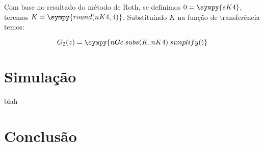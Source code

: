 \documentclass[a4paper,11pt]{article}
\newcommand{\npy}[1]{\sympy{round(#1,4)}}
\begin{document}
Com base no resultado do método de Roth, se definimos $0 = \sympy{sK4}$, teremos $K = \npy{nK4}$. Substituindo $K$ na função de transferência temos:

\begin{equation}\label{eq:closedloop-sys-oscilation}
    G_{2}(z) = \sympy{nGc.subs(K,nK4).simplify()}
\end{equation}


\section{Simulação}

blah

\section{Conclusão}






\end{document}
